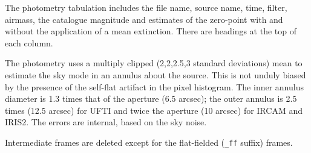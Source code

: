 \documentclass[twoside,11pt,nolof]{starlink}
\begin{document}
{{{         \sstitem
         The photometry tabulation includes the file name, source name,
         time, filter, airmass, the catalogue magnitude and estimates of
         the zero-point with and without the application of a mean
         extinction.  There are headings at the top of each column.

         \sstitem
         The photometry uses a multiply clipped (2,2,2.5,3 standard
         deviations) mean to estimate the sky mode in an annulus about the
         source.  This is not unduly biased by the presence of the self-flat
         artifact in the pixel histogram.  The inner annulus diameter is 1.3
         times that of the aperture (6.5 arcsec); the outer annulus is 2.5
         times (12.5 arcsec) for UFTI and twice the aperture (10 arcsec) for
         IRCAM and IRIS2.  The errors are internal, based on the sky noise.

         \sstitem
         Intermediate frames are deleted except for the flat-fielded ({\tt\_ff}
         suffix) frames.
      }
   }
   }
\end{document}
